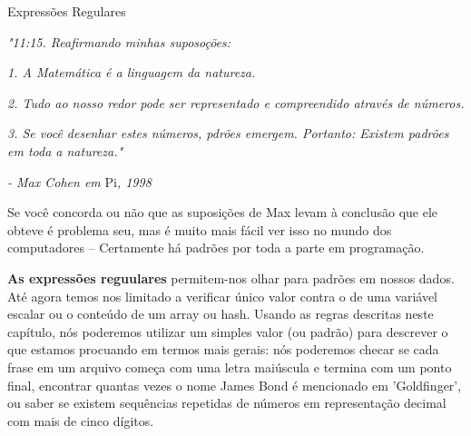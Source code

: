 \documentclass[a4paper,11pt]{book}
\begin{document}

\noindent 

\noindent 

\noindent 

\noindent 

\noindent 

\noindent 

\noindent 

\noindent 

\noindent 

\noindent 

\noindent 

\noindent 

\noindent 

\noindent 

\noindent 

\noindent Express\~oes Regulares

\noindent 

\noindent 

\noindent 

\noindent 

\noindent \textit{"11:15. Reafirmando minhas suposoções:}

\noindent 

\noindent \textit{1. A Matemática é a linguagem da natureza.}

\noindent \textit{2. Tudo ao nosso redor pode ser representado e compreendido através de números.}

\noindent \textit{3. Se você desenhar estes números, pdrões emergem. Portanto: Existem padrões em toda a natureza."}

\noindent 

\noindent \textit{- Max Cohen em }Pi\textit{, 1998}

\noindent 

\noindent Se você concorda ou não que as suposições de Max levam à conclusão que ele obteve é problema seu, mas é muito mais fácil ver isso no mundo dos computadores -- Certamente há padrões por toda a parte em programação.

\noindent 

\noindent \textbf{As expressões reguulares }permitem-nos olhar para padrões em nossos dados. Até agora temos nos limitado a verificar único valor contra o de uma variável escalar ou o conteúdo de um array ou hash. Usando as regras descritas neste capítulo, nós poderemos utilizar um simples valor (ou padrão) para descrever o que estamos procuando em termos mais gerais: nós poderemos checar se cada frase em um arquivo começa com uma letra maiúscula e termina com um ponto final, encontrar quantas vezes o nome James Bond é mencionado em 'Goldfinger', ou saber se existem sequências repetidas de números em representação decimal com mais de cinco dígitos.
\end{document}
